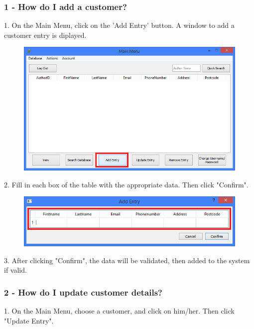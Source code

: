 \subsubsection{1 - How do I add a customer?} \label{sssec:Q1}

1. On the Main Menu, click on the 'Add Entry' button. A window to add a customer entry is diplayed.

\begin{figure}[H]
    \includegraphics[width=\textwidth]{./Manual/Tutorial/Q1/AddEntryHighlighted.png}
\end{figure}


2. Fill in each box of the table with the appropriate data. Then click "Confirm".

\begin{figure}[H]
    \includegraphics[width=\textwidth]{./Manual/Tutorial/Q1/AddingEntry.png}
\end{figure}

3. After clicking "Confirm", the data will be validated, then added to the system if valid.

\subsubsection{2 -  How do I update customer details?} \label{sssec:Q2}

1. On the Main Menu, choose a customer, and click on him/her. Then click "Update Entry".

